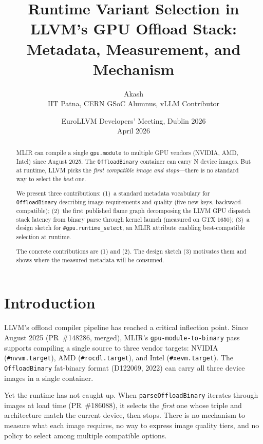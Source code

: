 \documentclass[11pt]{article}
\title{Runtime Variant Selection in LLVM's GPU Offload Stack:\newline
  Metadata, Measurement, and Mechanism}
\author{Akash \\
  IIT Patna, CERN GSoC Alumnus, vLLM Contributor}
\date{EuroLLVM Developers' Meeting, Dublin 2026 \\ April 2026}
\begin{document}
\maketitle

\begin{abstract}
MLIR can compile a single \texttt{gpu.module} to multiple GPU vendors (NVIDIA, AMD, Intel) since August 2025.
The \texttt{OffloadBinary} container can carry N device images.
But at runtime, LLVM picks the \textit{first compatible image and stops}---there is no standard way to select the \textit{best} one.

We present three contributions:
(1)~a standard metadata vocabulary for \texttt{OffloadBinary} describing image requirements and quality (five new keys, backward-compatible);
(2)~the first published flame graph decomposing the LLVM GPU dispatch stack latency from binary parse through kernel launch (measured on GTX 1650);
(3)~a design sketch for \texttt{\#gpu.runtime\_select}, an MLIR attribute enabling best-compatible selection at runtime.

The concrete contributions are (1) and (2).
The design sketch (3) motivates them and shows where the measured metadata will be consumed.
\end{abstract}

\section{Introduction}

LLVM's offload compiler pipeline has reached a critical inflection point.
Since August 2025 (PR~\#148286, merged), MLIR's \texttt{gpu-module-to-binary} pass supports compiling a single source to three vendor targets: NVIDIA (\texttt{\#nvvm.target}), AMD (\texttt{\#rocdl.target}), and Intel (\texttt{\#xevm.target}).
The \texttt{OffloadBinary} fat-binary format (D122069, 2022) can carry all three device images in a single container.

Yet the runtime has not caught up.
When \texttt{parseOffloadBinary} iterates through images at load time (PR~\#186088), it selects the \textit{first} one whose triple and architecture match the current device, then stops.
There is no mechanism to measure what each image requires, no way to express image quality tiers, and no policy to select among multiple compatible options.
\end{document}
